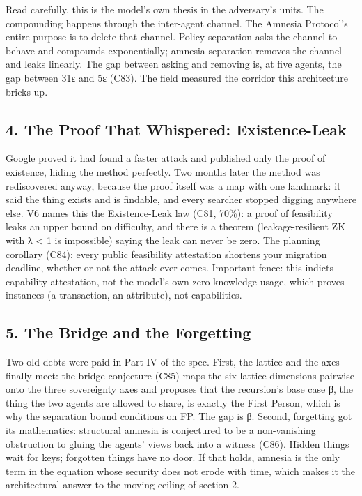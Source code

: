 \documentclass[
]{article}
\begin{document}
Read carefully, this is the model's own thesis in the adversary's units.
The compounding happens through the inter-agent channel. The Amnesia
Protocol's entire purpose is to delete that channel. Policy separation
asks the channel to behave and compounds exponentially; amnesia
separation removes the channel and leaks linearly. The gap between
asking and removing is, at five agents, the gap between 31ε and 5ε
(C83). The field measured the corridor this architecture bricks up.

\subsection{4. The Proof That Whispered:
Existence-Leak}\label{the-proof-that-whispered-existence-leak}

Google proved it had found a faster attack and published only the proof
of existence, hiding the method perfectly. Two months later the method
was rediscovered anyway, because the proof itself was a map with one
landmark: it said the thing exists and is findable, and every searcher
stopped digging anywhere else. V6 names this the Existence-Leak law
(C81, 70\%): a proof of feasibility leaks an upper bound on difficulty,
and there is a theorem (leakage-resilient ZK with λ \textless{} 1 is
impossible) saying the leak can never be zero. The planning corollary
(C84): every public feasibility attestation shortens your migration
deadline, whether or not the attack ever comes. Important fence: this
indicts capability attestation, not the model's own zero-knowledge
usage, which proves instances (a transaction, an attribute), not
capabilities.

\subsection{5. The Bridge and the
Forgetting}\label{the-bridge-and-the-forgetting}

Two old debts were paid in Part IV of the spec. First, the lattice and
the axes finally meet: the bridge conjecture (C85) maps the six lattice
dimensions pairwise onto the three sovereignty axes and proposes that
the recursion's base case β, the thing the two agents are allowed to
share, is exactly the First Person, which is why the separation bound
conditions on FP. The gap is β. Second, forgetting got its mathematics:
structural amnesia is conjectured to be a non-vanishing obstruction to
gluing the agents' views back into a witness (C86). Hidden things wait
for keys; forgotten things have no door. If that holds, amnesia is the
only term in the equation whose security does not erode with time, which
makes it the architectural answer to the moving ceiling of section 2.
\end{document}
